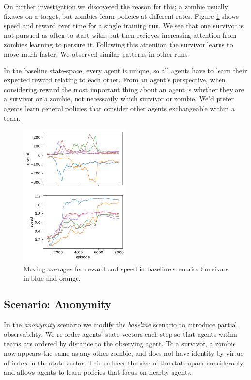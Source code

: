 \documentclass[11pt,a4paper]{article}
\begin{document}
On further investigation we discovered the reason for this; a zombie usually fixates on a target, but zombies learn policies at different rates.
Figure \ref{fig:baseline_speed} shows speed and reward over time for a single training run.
We see that one survivor is not pursued as often to start with, but then recieves increasing attention from zombies learning to persure it.
Following this attention the survivor learns to move much faster.
We observed similar patterns in other runs.

In the baseline state-space, every agent is unique, so all agents have to learn their expected reward relating to each other.
From an agent's perspective, when considering reward the most important thing about an agent is whether they are a survivor or a zombie, not necessarily which survivor or zombie.
We'd prefer agents learn general policies that consider other agents exchangeable within a team.

\begin{figure}
  \centering
  \includegraphics[width=0.5\textwidth]{figures/baseline_speed.png}
  \caption{Moving averages for reward and speed in baseline scenario. Survivors in blue and orange.}
  \label{fig:baseline_speed}
\end{figure}

\subsection{Scenario: Anonymity}
\label{sec:anon}

In the \emph{anonymity} scenario we modify the \emph{baseline} scenario to introduce partial observability.
We re-order agents' state vectors each step so that agents within teams are ordered by distance to the observing agent.
To a survivor, a zombie now appears the same as any other zombie, and does not have identity by virtue of index in the state vector.
This reduces the size of the state-space considerably, and allows agents to learn policies that focus on nearby agents.
\end{document}
